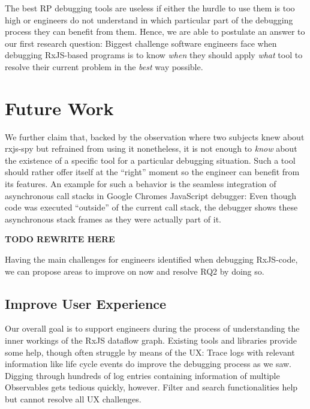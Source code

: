 \documentclass[sigplan,screen,review]{acmart}
\begin{document}
The best RP debugging tools are useless if either the hurdle to use them is too high or engineers do not understand in which particular part of the debugging process they can benefit from them. Hence, we are able to postulate an answer to our first research question: Biggest challenge software engineers face when debugging RxJS-based programs is to know \emph{when} they should apply \emph{what} tool to resolve their current problem in the \emph{best} way possible.

\section{Future Work}
\label{sec:future}

We further claim that, backed by the observation where two subjects knew about rxjs-spy but refrained from using it nonetheless, it is not enough to \emph{know} about the existence of a specific tool for a particular debugging situation. Such a tool should rather offer itself at the ``right'' moment so the engineer can benefit from its features. An example for such a behavior is the seamless integration of asynchronous call stacks in Google Chromes JavaScript debugger\cite{chromeasync}: Even though code was executed ``outside'' of the current call stack, the debugger shows these asynchronous stack frames as they were actually part of it.














\textbf{TODO REWRITE HERE}

Having the main challenges for engineers identified when debugging RxJS-code, we can propose areas to improve on now and resolve RQ2 by doing so.

\subsection{Improve User Experience}

Our overall goal is to support engineers during the process of understanding the inner workings of the RxJS dataflow graph. Existing tools and libraries provide some help, though often struggle by means of the UX: Trace logs with relevant information like life cycle events do improve the debugging process as we saw. Digging through hundreds of log entries containing information of multiple Observables gets tedious quickly, however. Filter and search functionalities help but cannot resolve all UX challenges.
\end{document}
